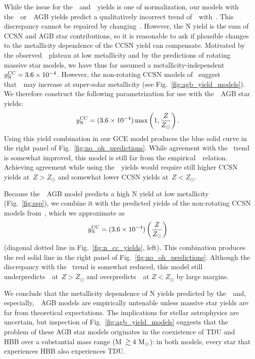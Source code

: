 \documentclass[ms.tex]{subfiles}
\begin{document}
While the issue for the~\cristallo~and~\ventura~yields is one of normalization,
our models with the~\karakasten~or~\karakas~AGB yields predict a
qualitatively incorrect trend of~\no~with~\oh.
This discrepancy cannot be repaired by changing~.
However, the N yield is the sum of CCSN and AGB star contributions, so it is
reasonable to ask if plausible changes to the metallicity dependence of the
CCSN yield can compensate.
Motivated by the observed~\no~plateau at low metallicity and by the predictions
of rotating massive star models, we have thus far assumed a
metallicity-independent~$y_\text{N}^\text{CC} = 3.6\times10^{-4}$.
However, the non-rotating CCSN models of~\citet{Nomoto2013} suggest
that~~may increase at super-solar metallicity (see
Fig.~\ref{fig:agb_yield_models}).
We therefore construct the following parametrization for use with
the~\karakas~AGB star yields:
\begin{equation}
y_\text{N}^\text{CC} = (3.6\times10^{-4})\max\left(1, \frac{Z}{Z_\odot}\right).
\label{eq:broken_yncc}
\end{equation}
Using this yield combination in our GCE model produces the blue solid curve
in the right panel of Fig.~\ref{fig:no_oh_predictions}.
While agreement with the~\citet{Dopita2016} trend is somewhat improved, this
model is still far from the empirical~\ohno~relation.
Achieving agreement while using the~\karakas~yields would require still higher
CCSN yields at~$Z > Z_\odot$ and somewhat lower CCSN yields at~$Z < Z_\odot$.
\par
Because the~\karakasten~AGB model predicts a high N yield at low metallicity
(Fig.~\ref{fig:ssp}), we combine it with the predicted yields of the
non-rotating CCSN models from~\citet{Limongi2018}, which we approximate as
\begin{equation}
y_\text{N}^\text{CC} = (3.6\times10^{-4})\left(\frac{Z}{Z_\odot}\right)
\label{eq:linear_yncc}
\end{equation}
(diagonal dotted line in Fig.~\ref{fig:n_cc_yields}, left).
This combination produces the red solid line in the right panel of
Fig.~\ref{fig:no_oh_predictions}.
Although the discrepancy with the~\citet{Dopita2016} trend is somewhat reduced,
this model still underpredicts~\no~at~$Z > Z_\odot$ and overpredicts~\no~at
$Z < Z_\odot$ by large margins.
\par
We conclude that the metallicity dependence of N yields predicted by
the~\karakas~and, especially,~\karakasten~AGB models are empirically
untenable unless massive star yields are far from theoretical expectations.
The implications for stellar astrophysics are uncertain, but inspection of
Fig.~\ref{fig:agb_yield_models} suggests that the problem of these AGB star
models originates in the coexistence of TDU and HBB over a substantial
mass range (M~$\gtrsim 4~\text{M}_\odot$): in both models, every star that experiences
HBB also experiences TDU.
\end{document}
